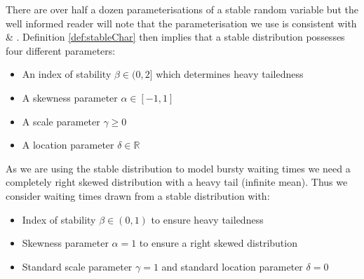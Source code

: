 \documentclass[honours,12pt]{UNSWthesis}
\newcommand{\R}{\mathbb{R}}
\newcommand{\1}{\mathbf 1}
\numberwithin{equation}{section}
\theoremstyle{definition}
\theoremstyle{remark}
\begin{document}
\noindent There are over half a dozen parameterisations of a stable random variable but the well informed reader will note that the parameterisation we use is consistent with \cite{MeerschaertStoev08} \& \cite{Samorodnitsky1994}. Definition \ref{def:stableChar} then implies that a stable distribution possesses four different parameters:
\begin{itemize}
	\item An index of stability $\beta \in (0,2]$ which determines heavy tailedness 
	\item A skewness parameter $\alpha \in [-1,1]$
	\item A scale parameter $\gamma\geq0$
	\item A location parameter $\delta \in \R$\\
\end{itemize}

\noindent As we are using the stable distribution to model bursty waiting times we need a completely right skewed distribution with a heavy tail (infinite mean). Thus we consider waiting times drawn from a stable distribution with:
\begin{itemize}
	\item Index of stability $\beta \in (0,1)$ to ensure heavy tailedness
	\item Skewness parameter $\alpha=1$ to ensure a right skewed distribution
	\item Standard scale parameter $\gamma=1$ and standard location parameter $\delta=0$\\
\end{itemize}
\end{document}
